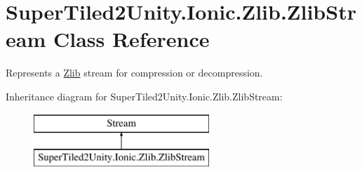 \hypertarget{class_super_tiled2_unity_1_1_ionic_1_1_zlib_1_1_zlib_stream}{}\section{Super\+Tiled2\+Unity.\+Ionic.\+Zlib.\+Zlib\+Stream Class Reference}
\label{class_super_tiled2_unity_1_1_ionic_1_1_zlib_1_1_zlib_stream}


Represents a \mbox{\hyperlink{namespace_super_tiled2_unity_1_1_ionic_1_1_zlib}{Zlib}} stream for compression or decompression.  


Inheritance diagram for Super\+Tiled2\+Unity.\+Ionic.\+Zlib.\+Zlib\+Stream\+:\begin{figure}[H]
\begin{center}
\leavevmode
\includegraphics[height=2.000000cm]{class_super_tiled2_unity_1_1_ionic_1_1_zlib_1_1_zlib_stream}
\end{center}
\end{figure}
